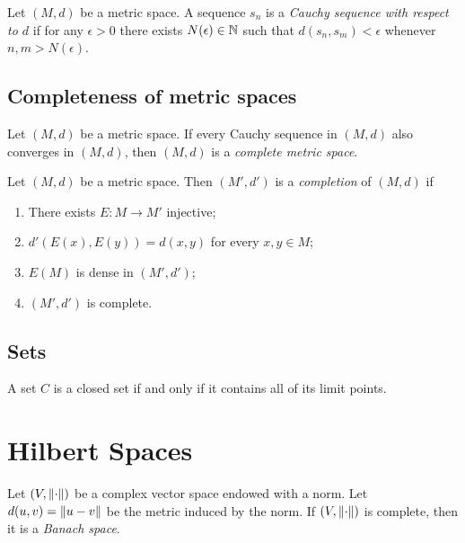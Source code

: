 \documentclass[oneside, 10pt, notitlepage]{book}
\begin{document}
\begin{definition}
	Let \((M,d)\) be a metric space. A sequence \(s_n\) is a \emph{Cauchy sequence with respect to \(d\)} if for any \(\epsilon>0\) there exists \(N(\epsilon)\in \mathbb{N}\) such that \(d(s_n,s_m)< \epsilon\) whenever \(n,m>N(\epsilon)\).
\end{definition}

\section{Completeness of metric spaces}

\begin{definition}
	Let \((M,d)\) be a metric space. If every Cauchy sequence in \((M,d)\) also converges in \((M,d)\), then \((M,d)\) is a \emph{complete metric space}.
\end{definition}

\begin{definition}
	Let \((M,d)\) be a metric space. Then \((M',d')\) is a \emph{completion} of \((M,d)\) if
	\begin{enumerate}
		\item There exists \(E:M\to M'\) injective;
		\item \(d'(E(x),E(y)) = d(x,y)\) for every \(x,y\in M\);
		\item \(E(M)\) is dense in \((M',d')\);
		\item \((M',d')\) is complete.
	\end{enumerate}
\end{definition}


\section{Sets}

\begin{definition}
	A set \(C\) is a closed set if and only if it contains all of its limit points.
\end{definition}







\chapter{Hilbert Spaces}
\minitoc

\begin{definition}
	Let \((V,\norm{\cdot})\) be a complex vector space endowed with a norm. Let \(d(u,v)=\norm{u-v}\) be the metric induced by the norm. If \((V,\norm{\cdot})\) is complete, then it is a \emph{Banach space}.
\end{definition}
\end{document}
